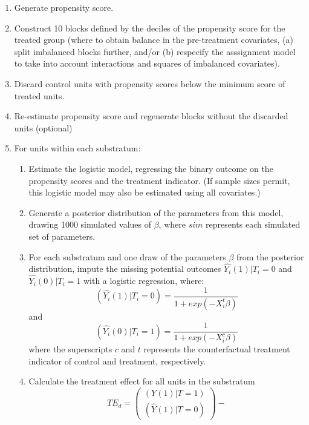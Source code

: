 \documentclass[11pt,titlepage]{article}
\begin{document}
\begin{enumerate}
\item Generate propensity score.
\item Construct 10 blocks defined by the deciles of the propensity
  score for the treated group (where to obtain balance
  in the pre-treatment covariates, (a) split imbalanced blocks further, and/or
  (b) respecify the asssignment model
  to take into account interactions and squares of imbalanced
  covariates).
\item Discard control units with propensity scores below the minimum
  score of treated units.
\item Re-estimate propensity score and regenerate blocks without the
  discarded units (optional)
\item For units within each substratum: \label{sub}
  \begin{enumerate}
  \item{Estimate the logistic model, regressing
      the binary outcome on the propensity scores and the treatment
      indicator.  (If sample sizes permit, this logistic model may
      also be estimated using all covariates.)} \label{sub1}
  \item{Generate a posterior distribution of the parameters from this
      model, drawing 1000 simulated values of $\beta$, where $sim$
      represents each simulated set of parameters.}
  \item{For each substratum and one draw of the parameters $\beta$ from the
      posterior distribution, impute the missing potential outcomes
      $\hat{Y_i}(1)|T_i=0$ and $\hat{Y_i}(0)|T_i=1$ with a logistic regression,
      where:
      \begin{equation}
        (\hat{Y_i}(1)|T_i=0) = \frac{1}{1+exp(-X_i^t \beta)}
      \end{equation}
      and 
      \begin{equation}
        (\hat{Y_i}(0)|T_i=1) = \frac{1}{1+exp(-X_i^c \beta)}
      \end{equation}
      where the superscripts $c$ and $t$ represents the counterfactual
      treatment indicator of control and treatment, respectively.}
  \item{Calculate the treatment effect for all units 
      in the substratum
      \begin{equation}
        TE_{d} = \left( \begin{array}{c}
            (Y(1) | T=1) \\
            (\hat{Y}(1) | T=0)
          \end{array} \right)- 

\end{equation}}
\end{enumerate}
\end{enumerate}
\end{document}
